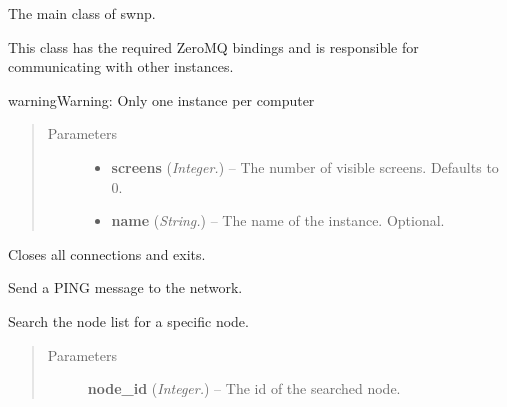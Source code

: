 \documentclass[letterpaper,10pt,english]{sphinxmanual}
\begin{document}
\begin{fulllineitems}
\label{api:swnp.SWNP}
The main class of swnp.

This class has the required ZeroMQ bindings and is responsible for communicating with other instances.

\begin{notice}{warning}{Warning:}
Only one instance per computer
\end{notice}
\begin{quote}\begin{description}
\item[{Parameters}] \leavevmode\begin{itemize}
\item {} 
\textbf{screens} (\emph{Integer.}) -- The number of visible screens. Defaults to 0.

\item {} 
\textbf{name} (\emph{String.}) -- The name of the instance. Optional.

\end{itemize}

\end{description}\end{quote}

\begin{fulllineitems}
\label{api:swnp.SWNP.close}
Closes all connections and exits.

\end{fulllineitems}


\begin{fulllineitems}
\label{api:swnp.SWNP.do_ping}
Send a PING message to the network.

\end{fulllineitems}


\begin{fulllineitems}
\label{api:swnp.SWNP.find_node}
Search the node list for a specific node.
\begin{quote}\begin{description}
\item[{Parameters}] \leavevmode
\textbf{node\_id} (\emph{Integer.}) -- The id of the searched node.


\end{description}
\end{quote}
\end{fulllineitems}
\end{fulllineitems}
\end{document}
